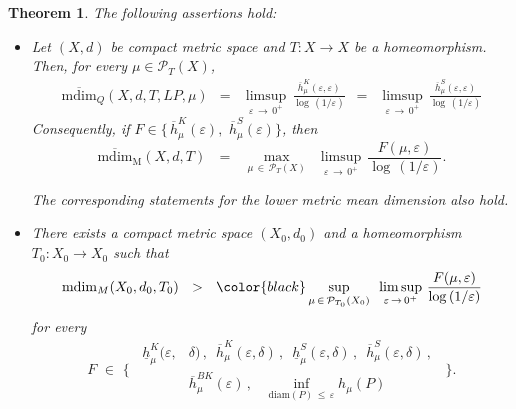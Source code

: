 \documentclass[11pt,a4paper,reqno]{amsart}
\theoremstyle{plain}
\newtheorem{maintheorem}{Theorem}
\theoremstyle{definition}
\newcommand{\ep} {\varepsilon}
\newcommand{\cP}{{\mathcal P}}
\newcommand{\cR}{{\mathcal R}}
\begin{document}
\begin{maintheorem}\label{teo:EYZ}
The following assertions hold: 
\begin{itemize}
\item[$(a)$] Let $(X,d)$ be compact metric space and $T \colon X \to X$ be a homeomorphism. Then, for every $\mu\in\cP_T(X)$,
\begin{eqnarray*}
\overline{\mathrm{mdim}}_Q(X,d,T,LP,\mu) &=& %
\limsup_{\ep\,\to\,0^+}\,\frac{\overline{h}^K_\mu(\ep,\ep)}{\log\,(1/\ep)} 
\,\,\,= \,\,\, \limsup_{\ep\,\to\,0^+}\,\frac{\overline{h}^S_\mu(\ep,\ep)}{\log\,(1/\ep)} 
\end{eqnarray*} 
Consequently, if 
$F\in\big\{\,\overline{h}^K_\mu(\ep),\,\,\overline{h}^S_\mu(\ep) \big\}$, then $$\mathrm{\overline{mdim}_M}(X,d,T)\,\,\,\, 
 =\,\,\,\, \max_{\mu\,\in\,\cP_T(X)}\, \,\,\limsup_{\ep\,\to\,0^+}\,\frac{F(\mu,\ep)}{\log\,(1/\ep)}.$$

 \noindent The corresponding statements for the lower metric mean dimension also hold.

\smallskip

\item[$(b)$] There exists a compact metric space $(X_0,d_0)$ and a homeomorphism $T_0 \colon X_0 \to X_0$ such that 
$$\mathrm{mdim}_M(X_0,d_0,T_0)\,\,\,\, 
 >\,\,\,\, 
 \color{black} \sup_{\mu\,\in\,\cP_{T_0}(X_0)}\, \,\,\limsup_{\ep\,\to\,0^+}\,\frac{F(\mu,\ep)}{\log\,(1/\ep)}$$
 for every 
 \begin{equation*}
    F\,\,\in\,\, \Bigg\{
\begin{aligned}
\,\,\,\underline{h}_\mu^K(\ep,&\delta)\,,\,\,\,
\overline{h}_\mu^K(\ep,\delta)\,,\,\,\,
\underline{h}_\mu^S(\ep,\delta)\,,\,\,\,
\overline{h}_\mu^S(\ep,\delta)\,,\,\,\,
\\&
\overline{h}_\mu^{BK}(\ep)\,,\,\,\,\,\, 
\inf_{\mathrm{diam}(P)\,\le\, \varepsilon} h_\mu(P)\,\,\,
\end{aligned}
\Bigg\}.
\end{equation*} 
\end{itemize}
\end{maintheorem}
\smallskip
\end{document}

